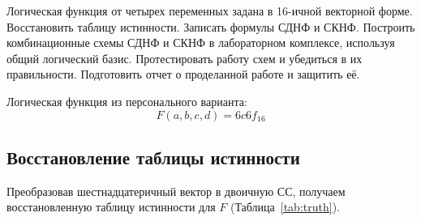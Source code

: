 \documentclass[a4paper]{article}
\begin{document}

    \tableofcontents{}

    \clearpage


    \introduction
    Логическая функция от четырех переменных задана в 16-ичной векторной форме.
    Восстановить таблицу истинности.
    Записать формулы СДНФ и СКНФ.
    Построить комбинационные схемы СДНФ и СКНФ в лабораторном комплексе,
    используя общий логический базис.
    Протестировать работу схем и убедиться в их правильности.
    Подготовить отчет о проделанной работе и защитить её.

    Логическая функция из персонального варианта:
    \[ F(a, b, c, d) = 6c6f_{16} \]


    \implementation

    \subsection{Восстановление таблицы истинности}\label{subsec:table-recovering}
    Преобразовав шестнадцатеричный вектор в двоичную СС, получаем восстановленную таблицу
    истинности для $ F $ (Таблица~\ref{tab:truth}).
\end{document}

